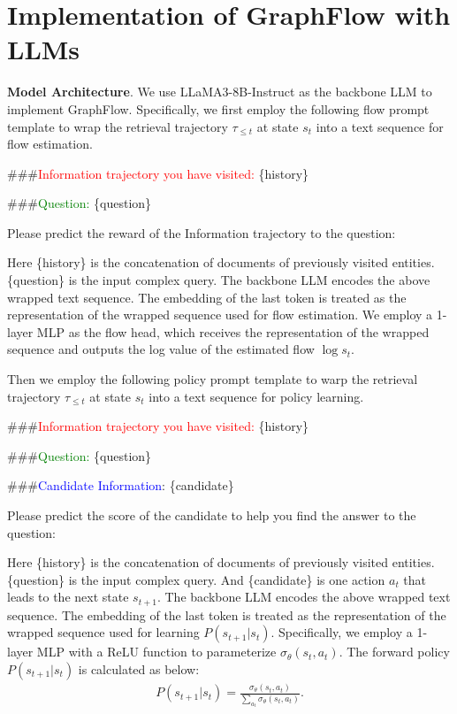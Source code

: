 \documentclass{article}
\newcommand{\xhdr}[1]{{\vspace{1pt}\noindent\bfseries #1}.}
\begin{document}
\section{Implementation of GraphFlow with LLMs}

\xhdr{Model Architecture}
We use LLaMA3-8B-Instruct as the backbone LLM to implement GraphFlow.
Specifically, we first employ the following flow prompt template to wrap the retrieval trajectory $\tau_{\leq t}$ at state $s_{t}$ into a text sequence for flow estimation.
\begin{tcolorbox}[colback=red!5!white,colframe=red!75!black,breakable]
\#\#\#\textcolor{red}{Information trajectory you have visited:} \{history\}

\#\#\#\textcolor{green}{Question:} \{question\}

Please predict the reward of the Information trajectory to the question:

\end{tcolorbox}
Here \{history\} is the concatenation of documents of previously visited entities. \{question\} is the input complex query.
The backbone LLM encodes the above wrapped text sequence.
The embedding of the last token is treated as the representation of the wrapped sequence used for flow estimation.
We employ a 1-layer MLP as the flow head, which receives the representation of the wrapped sequence and outputs the log value of the estimated flow $\log{s_{t}}$.

Then we employ the following policy prompt template to warp the retrieval trajectory $\tau_{\leq t}$ at state $s_{t}$ into a text sequence for policy learning. 



\begin{tcolorbox}[colback=red!5!white,colframe=red!75!black,breakable]
\#\#\#\textcolor{red}{Information trajectory you have visited:} \{history\}

\#\#\#\textcolor{green}{Question:} \{question\}

\#\#\#\textcolor{blue}{Candidate Information}: \{candidate\}

Please predict the score of the candidate to help you find the answer to the question:

\end{tcolorbox}
Here \{history\} is the concatenation of documents of previously visited entities. \{question\} is the input complex query.
And \{candidate\} is one action $a_{t}$ that leads to the next state $s_{t+1}$.
The backbone LLM encodes the above wrapped text sequence.
The embedding of the last token is treated as the representation of the wrapped sequence used for learning $P(s_{t+1}|s_{t})$.
Specifically, we employ a 1-layer MLP with a ReLU function to parameterize $\sigma_{\theta}(s_{t},a_{t})$.
The forward policy $P(s_{t+1}|s_{t})$ is calculated as below:
\begin{equation}
    \begin{aligned}
        P(s_{t+1}|s_{t}) = \frac{\sigma_{\theta}(s_{t},a_{t})}{\sum_{a_{t}}\sigma_{\theta}(s_{t},a_{t})}.
    \end{aligned}
\end{equation}
\end{document}
